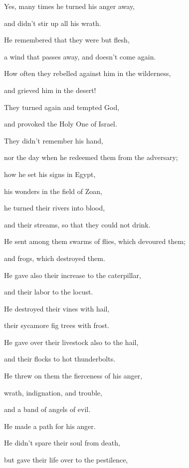 {\par }{\QB Yes, many times he turned his anger away,
\par }{\QB and didn’t stir up all his wrath.
\par }{\Q {}He remembered that they were but flesh,
\par }{\QB a wind that passes away, and doesn’t come again.
\par }{\Q {}How often they rebelled against him in the wilderness,
\par }{\QB and grieved him in the desert!
\par }{\Q {}They turned again and tempted God,
\par }{\QB and provoked the Holy One of Israel.
\par }{\Q {}They didn’t remember his hand,
\par }{\QB nor the day when he redeemed them from the adversary;
\par }{\Q {}how he set his signs in Egypt,
\par }{\QB his wonders in the field of Zoan,
\par }{\Q {}he turned their rivers into blood,
\par }{\QB and their streams, so that they could not drink.
\par }{\Q {}He sent among them swarms of flies, which devoured them;
\par }{\QB and frogs, which destroyed them.
\par }{\Q {}He gave also their increase to the caterpillar,
\par }{\QB and their labor to the locust.
\par }{\Q {}He destroyed their vines with hail,
\par }{\QB their sycamore fig trees with frost.
\par }{\Q {}He gave over their livestock also to the hail,
\par }{\QB and their flocks to hot thunderbolts.
\par }{\Q {}He threw on them the fierceness of his anger,
\par }{\QB wrath, indignation, and trouble,
\par }{\QB and a band of angels of evil.
\par }{\Q {}He made a path for his anger.
\par }{\QB He didn’t spare their soul from death,
\par }{\QB but gave their life over to the pestilence,
}
